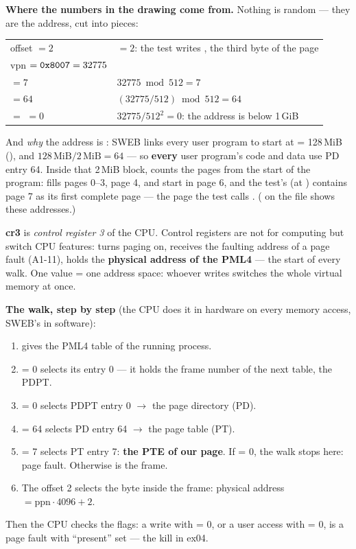 \documentclass[11pt]{report}
\begin{document}
\textbf{Where the numbers in the drawing come from.} Nothing is random --- they are the address,
cut into pieces:
\begin{center}
\small
\begin{tabular}{L{4.4cm}L{10.4cm}}
\toprule
offset $= 2$ &  $= 2$: the test writes , the third byte of the page \\
vpn $= \texttt{0x8007} = 32775$ &  \\
 $= 7$ & $32775 \bmod 512 = 7$ \\
 $= 64$ & $(32775 / 512) \bmod 512 = 64$ \\
 $=$  $= 0$ & $32775 / 512^2 = 0$: the address is below 1\,GiB \\
\bottomrule
\end{tabular}
\end{center}
And \emph{why} the address is : SWEB links every user program to start at
 = 128\,MiB (), and $128\,\text{MiB} / 2\,\text{MiB} = 64$ ---
so \textbf{every} user program's code and data use PD entry 64. Inside that 2\,MiB block,
 counts the pages from the start of the program:  fills pages 0--3,
 page 4,  and  start in page 6, and the test's
 (at ) contains page 7 as its first complete page --- the page the test
calls . ( on the  file shows these addresses.)

\textbf{cr3} is \emph{control register 3} of the CPU. Control registers are not for computing but
switch CPU features:  turns paging on,  receives the faulting address of a page
fault (A1-11),  holds the \textbf{physical address of the PML4} --- the start of every
walk. One  value = one address space: whoever writes  switches the whole
virtual memory at once.

\textbf{The walk, step by step} (the CPU does it in hardware on every memory access, SWEB's
 in software):
\begin{enumerate}[leftmargin=1.4em,itemsep=1pt]
\item {} gives the PML4 table of the running process.
\item {} = 0 selects its entry 0 --- it holds the frame number of the next table, the PDPT.
\item {} = 0 selects PDPT entry 0 $\to$ the page directory (PD).
\item {} = 64 selects PD entry 64 $\to$ the page table (PT).
\item {} = 7 selects PT entry 7: \textbf{the PTE of our page}. If  = 0, the walk
  stops here: page fault. Otherwise  is the frame.
\item The offset 2 selects the byte inside the frame: physical address $= \text{ppn} \cdot 4096 + 2$.
\end{enumerate}
Then the CPU checks the flags: a write with  = 0, or a user access with
 = 0, is a page fault with ``present'' set --- the kill in ex04.
\end{document}
